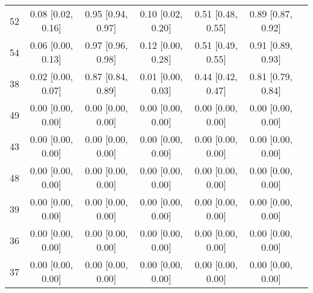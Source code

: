 \documentclass[8pt]{article}
\begin{document}
\begin{center}
\begin{footnotesize}
\begin{longtable}{|ccccccc|}
 52 &  0.08 [0.02, 0.16] &  0.95 [0.94, 0.97] &  0.10 [0.02, 0.20] &  0.51 [0.48, 0.55] &  0.89 [0.87, 0.92] \\
 54 &  0.06 [0.00, 0.13] &  0.97 [0.96, 0.98] &  0.12 [0.00, 0.28] &  0.51 [0.49, 0.55] &  0.91 [0.89, 0.93] \\
 38 &  0.02 [0.00, 0.07] &  0.87 [0.84, 0.89] &  0.01 [0.00, 0.03] &  0.44 [0.42, 0.47] &  0.81 [0.79, 0.84] \\
 49 &  0.00 [0.00, 0.00] &  0.00 [0.00, 0.00] &  0.00 [0.00, 0.00] &  0.00 [0.00, 0.00] &  0.00 [0.00, 0.00] \\
 43 &  0.00 [0.00, 0.00] &  0.00 [0.00, 0.00] &  0.00 [0.00, 0.00] &  0.00 [0.00, 0.00] &  0.00 [0.00, 0.00] \\
 48 &  0.00 [0.00, 0.00] &  0.00 [0.00, 0.00] &  0.00 [0.00, 0.00] &  0.00 [0.00, 0.00] &  0.00 [0.00, 0.00] \\
 39 &  0.00 [0.00, 0.00] &  0.00 [0.00, 0.00] &  0.00 [0.00, 0.00] &  0.00 [0.00, 0.00] &  0.00 [0.00, 0.00] \\
 36 &  0.00 [0.00, 0.00] &  0.00 [0.00, 0.00] &  0.00 [0.00, 0.00] &  0.00 [0.00, 0.00] &  0.00 [0.00, 0.00] \\
 37 &  0.00 [0.00, 0.00] &  0.00 [0.00, 0.00] &  0.00 [0.00, 0.00] &  0.00 [0.00, 0.00] &  0.00 [0.00, 0.00] \\
\end{longtable}
\end{footnotesize}
\end{center}
\end{document}
